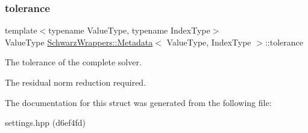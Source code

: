 \subsubsection{\texorpdfstring{tolerance}{tolerance}}
{\footnotesize\ttfamily template$<$typename Value\+Type, typename Index\+Type$>$ \\
Value\+Type \hyperlink{structSchwarzWrappers_1_1Metadata}{Schwarz\+Wrappers\+::\+Metadata}$<$ Value\+Type, Index\+Type $>$\+::tolerance}



The tolerance of the complete solver. 

The residual norm reduction required. 

The documentation for this struct was generated from the following file\+:\begin{DoxyCompactItemize}
\item 
settings.\+hpp (d6ef4fd)\end{DoxyCompactItemize}
